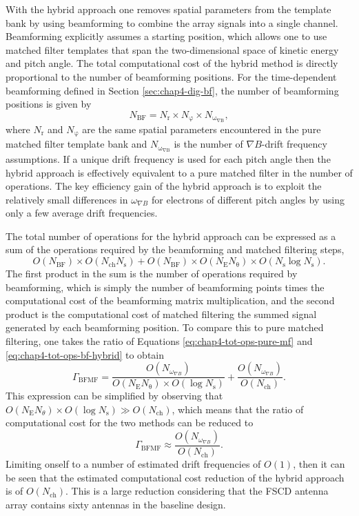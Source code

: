 With the hybrid approach one removes spatial parameters from the template bank by using beamforming to combine the array signals into a single channel. Beamforming explicitly assumes a starting position, which allows one to use matched filter templates that span the two-dimensional space of kinetic energy and pitch angle. The total computational cost of the hybrid method is directly proportional to the number of beamforming positions. For the time-dependent beamforming defined in Section \ref{sec:chap4-dig-bf}, the number of beamforming positions is given by 
\begin{equation}
    N_\mathrm{BF}=N_\mathrm{r}\times N_\mathrm{\varphi}\times N_\mathrm{\omega_{\nabla B}},
\end{equation}
where $N_\mathrm{r}$ and $N_\mathrm{\varphi}$ are the same spatial parameters encountered in the pure matched filter template bank and $N_\mathrm{\omega_{\nabla B}}$ is the number of $\nabla B$-drift frequency assumptions. If a unique drift frequency is used for each pitch angle then the hybrid approach is effectively equivalent to a pure matched filter in the number of operations. The key efficiency gain of the hybrid approach is to exploit the relatively small differences in $\omega_{\nabla B}$ for electrons of different pitch angles by using only a few average drift frequencies. 

The total number of operations for the hybrid approach can be expressed as a sum of the operations required by the beamforming and matched filtering steps,
\begin{equation}
    O(N_\mathrm{BF})\times O(N_\mathrm{ch}N_\mathrm{s}) + O(N_\mathrm{BF})\times O(N_\mathrm{E}N_\mathrm{\theta})\times O(N_\mathrm{s}\log{N_\mathrm{s}}).
    \label{eq:chap4-tot-ops-bf-hybrid}
\end{equation}
The first product in the sum is the number of operations required by beamforming, which is simply the number of beamforming points times the computational cost of the beamforming matrix multiplication, and the second product is the computational cost of matched filtering the summed signal generated by each beamforming position. To compare this to pure matched filtering, one takes the ratio of Equations \ref{eq:chap4-tot-ops-pure-mf} and \ref{eq:chap4-tot-ops-bf-hybrid} to obtain 
\begin{equation}
    \Gamma_\mathrm{BFMF}=\frac{O(N_{\omega_{\nabla B}})}{O(N_\mathrm{E}N_\mathrm{\theta})\times O(\log{N_\mathrm{s}})} + \frac{O(N_{\omega_{\nabla B}})}{O(N_\mathrm{ch})}.
\end{equation}
This expression can be simplified by observing that $O(N_\mathrm{E}N_\theta)\times O(\log{N_\mathrm{s}})\gg O(N_\mathrm{ch})$, which means that the ratio of computational cost for the two methods can be reduced to
\begin{equation}
    \Gamma_\mathrm{BFMF}\approx \frac{O(N_{\omega_{\nabla B}})}{O(N_\mathrm{ch})}.
\end{equation} 
Limiting onself to a number of estimated drift frequencies of $O(1)$, then it can be seen that the estimated computational cost reduction of the hybrid approach is of $O(N_\mathrm{ch})$. This is a large reduction considering that the FSCD antenna array contains sixty antennas in the baseline design. 


